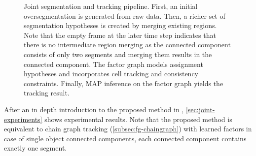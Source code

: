 \begin{figure}
    \centering
    \scalebox{0.8}{
        
    }
    \caption[Joint segmentation and tracking pipeline]{Joint segmentation and tracking
        pipeline. First, an initial oversegmentation is generated from raw data. Then, a richer set
        of segmentation hypotheses is created by merging existing regions. Note that the empty frame
        at the later time step indicates that there is no intermediate region merging as the
        connected component consists of only two segments and merging them results in the connected
        component. The factor graph models assignment hypotheses and incorporates cell tracking and
        consistency constraints. Finally, MAP inference on the factor graph yields the tracking
        result.}
    \label{fig:joint-pipeline}
\end{figure}

After an in depth introduction to the proposed method in
, \cref{sec:joint-experiments} shows
experimental results. Note that the proposed method is equivalent to chain graph tracking
(\cref{subsec:fg-chaingraph}) with learned factors in case of single object connected components,
\ie each connected component contains exactly one segment.

